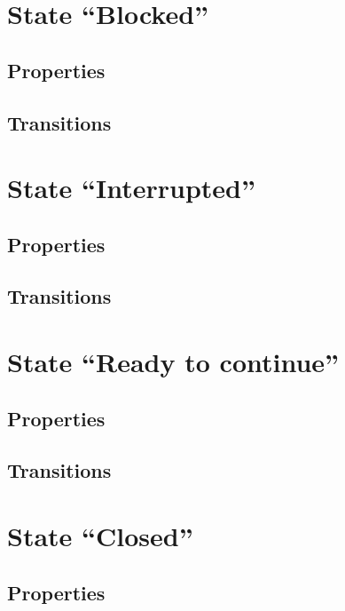 \section{State ``Blocked''}\label{sec4:state-blocked}

\subsection{Properties}\label{sec4:properties3}

\subsection{Transitions}\label{sec4:transitions3}

\section{State ``Interrupted''}\label{sec4:interrupted}

\subsection{Properties}\label{sec4:properties4}

\subsection{Transitions}\label{sec4:transitions4}

\section{State ``Ready to continue''}\label{sec4:state-ready-continue}

\subsection{Properties}\label{sec4:properties5}

\subsection{Transitions}\label{sec4:transitions5}

\section{State ``Closed''}\label{sec4:state-closed}

\subsection{Properties}\label{sec4:properties6}

